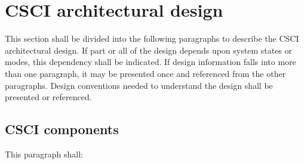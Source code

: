 \documentclass{fidata-report-template}
\begin{document}
\section{CSCI architectural design}

This section shall be divided into the following paragraphs to describe
the CSCI architectural design. If part or all of the design depends upon
system states or modes, this dependency shall be indicated. If design
information falls into more than one paragraph, it may be presented once
and referenced from the other paragraphs. Design conventions needed to
understand the design shall be presented or referenced.

\subsection{CSCI components}

This paragraph shall:
\end{document}
